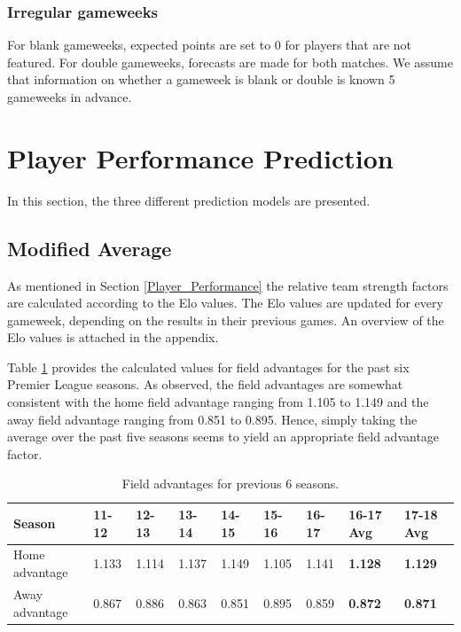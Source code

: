\subsubsection{Irregular gameweeks}
For blank gameweeks, expected points are set to 0 for players that are not featured. For double gameweeks, forecasts are made for both matches. We assume that information on whether a gameweek is blank or double is known 5 gameweeks in advance.

\newpage

\section{Player Performance Prediction}
\label{Exp_setup_Player_Performance_Prediction}

In this section, the three different prediction models are presented.

\subsection{Modified Average}
As mentioned in Section \ref{Player_Performance} the relative team strength factors are calculated according to the Elo values. The Elo values are updated for every gameweek, depending on the results in their previous games. An overview of the Elo values is attached in the appendix. 

\newpar

Table \ref{Field advantage} provides the calculated values for field advantages for the past six Premier League seasons. As observed, the field advantages are somewhat consistent with the home field advantage ranging from 1.105 to 1.149 and the away field advantage ranging from 0.851 to 0.895. Hence, simply taking the average over the past five seasons seems to yield an appropriate field advantage factor. 

\begin{table}[H]
\centering
\smaller
\begin{tabular}{|l|l|l|l|l|l|l|l|l|}
\hline
Season & 11-12    & 12-13   & 13-14    & 14-15    & 15-16 & 16-17 & 16-17 Avg & 17-18 Avg \\ 
\hline
Home advantage & 1.133 & 1.114 & 1.137 & 1.149 & 1.105 & 1.141 & \textbf{1.128} & \textbf{1.129}\\
\hline
Away advantage & 0.867 & 0.886 & 0.863 & 0.851 & 0.895 & 0.859 & \textbf{0.872} & \textbf{0.871}\\
\hline
\end{tabular}
\caption{Field advantages for previous 6 seasons.}
\label{Field advantage}
\end{table}

